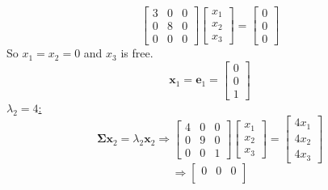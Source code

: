 \begin{enumerate}[font=\bfseries]
\begin{enumerate}
\[\begin{bmatrix}
                    3 & 0 & 0\\
                    0 & 8 & 0\\
                    0 & 0 & 0
                \end{bmatrix}
                \begin{bmatrix}
                    x_1 \\
                    x_2 \\
                    x_3
                \end{bmatrix}
                =
                \begin{bmatrix}
                    0 \\
                    0 \\
                    0
                \end{bmatrix}
            \]
            So $x_1 = x_2 = 0$ and $x_3$ is free.
            \[
                \mathbf{x}_1
                =
                \mathbf{e}_1
                =
                \begin{bmatrix}
                    0 \\
                    0 \\
                    1
                \end{bmatrix}
            \]
            \underline{$\lambda_2 = 4$:}
            \[
                \mathbf{\Sigma}\mathbf{x}_2 = \lambda_2\mathbf{x}_2
                \Rightarrow
                \begin{bmatrix}
                    4 & 0 & 0\\
                    0 & 9 & 0\\
                    0 & 0 & 1
                \end{bmatrix}
                \begin{bmatrix}
                    x_1 \\
                    x_2 \\
                    x_3
                \end{bmatrix}
                =
                \begin{bmatrix}
                    4x_1 \\
                    4x_2 \\
                    4x_3
                \end{bmatrix}
            \]
            \[
                \Rightarrow
                \begin{bmatrix}
                    0 & 0 & 0\\

\end{bmatrix}\]
\end{enumerate}
\end{enumerate}
